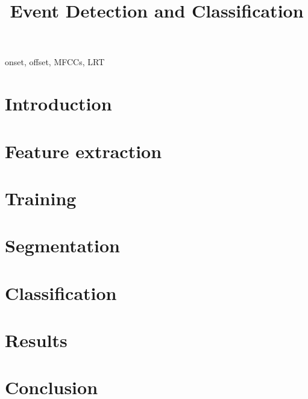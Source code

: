 \documentclass{article}
\title{Event Detection and Classification}
\begin{document}
\ninept
\maketitle

\begin{sloppy}

\begin{abstract}

\end{abstract}

\begin{keywords}
onset, offset, MFCCs, LRT
\end{keywords}

\section{Introduction}
\label{sec:intro}


\section{Feature extraction}
\label{sec:feature}


\section{Training}
\label{sec:training}


\section{Segmentation}
\label{sec:segmentation}


\section{Classification}
\label{sec:classification}


\section{Results}
\label{sec:results}


\section{Conclusion}
\label{sec:conclusion}




\end{sloppy}
\end{document}
